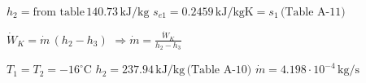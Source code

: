 \( h_2 = \text{from table} \, 140.73 \, \text{kJ/kg} \)  
\( s_{e1} = 0.2459 \, \text{kJ/kgK} = s_1 \, \text{(Table A-11)} \)  

\( \dot{W}_K = \dot{m} \, (h_2 - h_3) \)  
\( \Rightarrow \dot{m} = \frac{\dot{W}_K}{h_2 - h_3} \)  

\( T_1 = T_2 = -16^\circ \text{C} \)  
\( h_2 = 237.94 \, \text{kJ/kg} \, \text{(Table A-10)} \)  
\( \dot{m} = 4.198 \cdot 10^{-4} \, \text{kg/s} \)